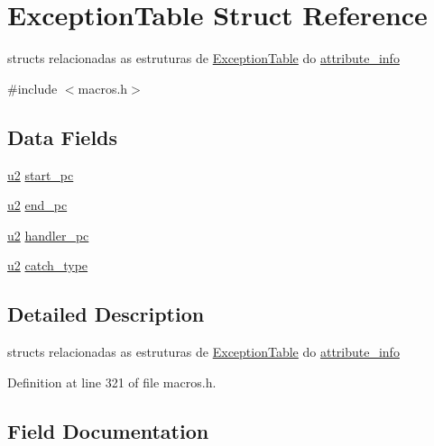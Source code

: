 \hypertarget{struct_exception_table}{}\section{Exception\+Table Struct Reference}
\label{struct_exception_table}


structs relacionadas as estruturas de \hyperlink{struct_exception_table}{Exception\+Table} do \hyperlink{structattribute__info}{attribute\+\_\+info}  




{\ttfamily \#include $<$macros.\+h$>$}

\subsection*{Data Fields}
\begin{DoxyCompactItemize}
\item 
\hyperlink{macros_8h_aa76d8c8015643c6a837661a10142016e}{u2} \hyperlink{struct_exception_table_a3ded0b47a89e0816c20dc577a82a1cd5}{start\+\_\+pc}
\item 
\hyperlink{macros_8h_aa76d8c8015643c6a837661a10142016e}{u2} \hyperlink{struct_exception_table_a9c136439106544c4d1c986316d6d5fa2}{end\+\_\+pc}
\item 
\hyperlink{macros_8h_aa76d8c8015643c6a837661a10142016e}{u2} \hyperlink{struct_exception_table_a69a19b4db26dd1a8341f02051cb221a7}{handler\+\_\+pc}
\item 
\hyperlink{macros_8h_aa76d8c8015643c6a837661a10142016e}{u2} \hyperlink{struct_exception_table_a0f7b3379ca0a3516e71359436ae5abf1}{catch\+\_\+type}
\end{DoxyCompactItemize}


\subsection{Detailed Description}
structs relacionadas as estruturas de \hyperlink{struct_exception_table}{Exception\+Table} do \hyperlink{structattribute__info}{attribute\+\_\+info} 

Definition at line 321 of file macros.\+h.



\subsection{Field Documentation}
\hypertarget{struct_exception_table_a0f7b3379ca0a3516e71359436ae5abf1}{}
